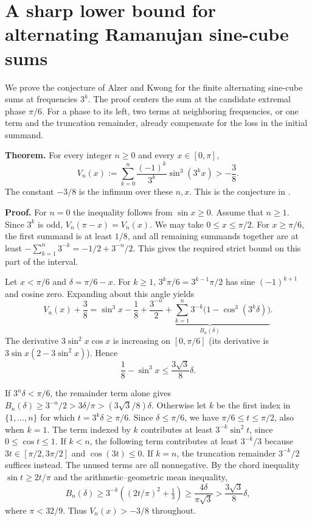 \documentclass[11pt,a4paper]{article}
\numberwithin{equation}{section}
\theoremstyle{definition}
\theoremstyle{remark}
\newenvironment{sectionabstract}{\par\smallskip\begingroup\small\noindent}{\par\endgroup\medskip}
\begin{document}
\section{\texorpdfstring{A sharp lower bound for alternating Ramanujan sine-cube sums}{A sharp lower bound for alternating Ramanujan sine-cube sums}}\label{section:r44keio}
\par\medskip


\begin{sectionabstract}
We prove the conjecture of Alzer and Kwong for the finite alternating sine-cube sums at frequencies $3^k$. The proof centers the sum at the candidate extremal phase $\pi/6$. For a phase to its left, two terms at neighboring frequencies, or one term and the truncation remainder, already compensate for the loss in the initial summand.
\end{sectionabstract}

\textbf{Theorem.} For every integer $n\ge0$ and every $x\in[0,\pi]$,
\[
 V_n(x):=\sum_{k=0}^n\frac{(-1)^k}{3^k}\sin^3(3^k x)>-\frac38.
\]
The constant $-3/8$ is the infimum over these $n,x$. This is the conjecture in \cite[Section 4, (27)]{r44keio:ak}.

\textbf{Proof.} For $n=0$ the inequality follows from $\sin x\ge0$. Assume that $n\ge1$. Since $3^k$ is odd, $V_n(\pi-x)=V_n(x)$. We may take $0\le x\le\pi/2$. For $x\ge\pi/6$, the first summand is at least $1/8$, and all remaining summands together are at least $-\sum_{k=1}^n3^{-k}=-1/2+3^{-n}/2$. This gives the required strict bound on this part of the interval.

Let $x<\pi/6$ and $\delta=\pi/6-x$. For $k\ge1$, $3^k\pi/6=3^{k-1}\pi/2$ has sine $(-1)^{k+1}$ and cosine zero. Expanding about this angle yields
\[
 V_n(x)+\frac38=\sin^3x-\frac18+
 \underbrace{\frac{3^{-n}}2+\sum_{k=1}^n3^{-k}\bigl(1-\cos^3(3^k\delta)\bigr)}_{B_n(\delta)} .
\]
The derivative $3\sin^2 x\cos x$ is increasing on $[0,\pi/6]$ (its derivative is $3\sin x(2-3\sin^2 x)$). Hence
\[
 \frac18-\sin^3 x\le\frac{3\sqrt3}{8}\delta.
\]

If $3^n\delta<\pi/6$, the remainder term alone gives $B_n(\delta)\ge3^{-n}/2>3\delta/\pi>(3\sqrt3/8)\delta$. Otherwise let $k$ be the first index in $\{1,\ldots,n\}$ for which $t=3^k\delta\ge\pi/6$. Since $\delta\le\pi/6$, we have $\pi/6\le t\le\pi/2$, also when $k=1$. The term indexed by $k$ contributes at least $3^{-k}\sin^2 t$, since $0\le\cos t\le1$. If $k<n$, the following term contributes at least $3^{-k}/3$ because $3t\in[\pi/2,3\pi/2]$ and $\cos(3t)\le0$. If $k=n$, the truncation remainder $3^{-k}/2$ suffices instead. The unused terms are all nonnegative. By the chord inequality $\sin t\ge 2t/\pi$ and the arithmetic--geometric mean inequality,
\[
 B_n(\delta)\ge 3^{-k}\left((2t/\pi)^2+\tfrac13\right)
 \ge\frac{4\delta}{\pi\sqrt3}>\frac{3\sqrt3}{8}\delta ,
\]
where $\pi<32/9$. Thus $V_n(x)>-3/8$ throughout.
\end{document}

